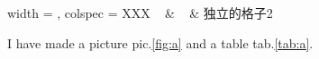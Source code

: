 \documentclass[AutoFakeBold]{ctexart}
\begin{document}
\begin{multicols}{2}
\begin{table}[H]
\begin{tblr}{
                width = \linewidth,
                colspec = {XXX}
            }
                ~ & ~ & 独立的格子2 \\
                \hline 
            \end{tblr}
            \label{tab:a}
        \end{table}

        I have made a picture pic.\ref{fig:a} and a table tab.\ref{tab:a}.
    \end{multicols}
    
   

    \makeenglishtitle
    \abstract[english]{
        \qquad \lipsum[2]
    }
    
    
\end{document}
